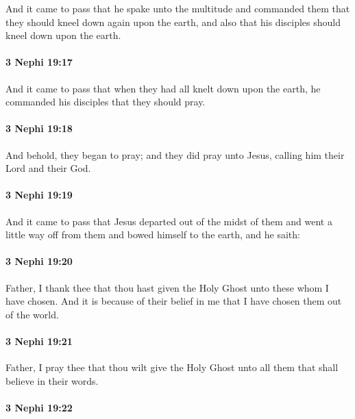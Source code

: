 			And it came to pass that he spake unto the multitude
			and commanded them that they should kneel down again upon the earth,
			and also that his disciples should kneel down upon the earth.

		\paragraph{3 Nephi 19:17} %
			\label{3NEPHI-19-17}

			And it came to pass that when they had all knelt down upon the earth,
			he commanded his disciples that they should pray.

		\paragraph{3 Nephi 19:18} %
			\label{3NEPHI-19-18}

			And behold, they began to pray;
			and they did pray unto Jesus, calling him their Lord and their God.

		\paragraph{3 Nephi 19:19} %
			\label{3NEPHI-19-19}

			And it came to pass that Jesus departed out of the midst of them
			and went a little way off from them and bowed himself to the earth, and he saith:

		\paragraph{3 Nephi 19:20} %
			\label{3NEPHI-19-20}

			Father, I thank thee that thou hast given the Holy Ghost
			unto these whom I have chosen.
			And it is because of their belief in me
			that I have chosen them out of the world.

		\paragraph{3 Nephi 19:21} %
			\label{3NEPHI-19-21}

			Father, I pray thee that thou wilt give the Holy Ghost
			unto all them that shall believe in their words.

		\paragraph{3 Nephi 19:22} %
			\label{3NEPHI-19-22}

